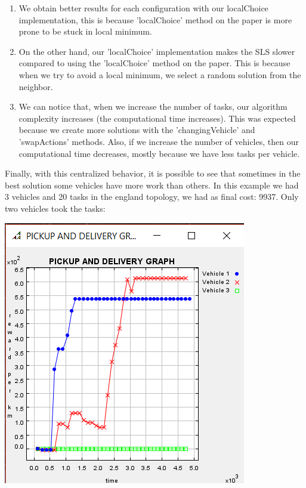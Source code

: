 \documentclass[11pt]{article}
\begin{document}
\begin{enumerate}
\item We obtain better results for each configuration with our localChoice implementation, this is because 'localChoice' method on the paper is more prone to be stuck in local minimum.
\item On the other hand, our 'localChoice' implementation makes the SLS slower compared to using the 'localChoice' method on the paper. This is because when we try to avoid a local minimum, we select a random solution from the neighbor.
\item We can notice that, when we increase the number of tasks, our algorithm complexity increases (the computational time increases). This was expected because we create more solutions with the 'changingVehicle' and 'swapActions' methods. Also, if we increase the number of vehicles, then our computational time decreases, mostly because we have less tasks per vehicle.
\end{enumerate}
\normalsize
Finally, with this centralized behavior, it is possible to see that sometimes in the best solution some vehicles have more work than others. In this example we had 3 vehicles and 20 tasks in the england topology, we had as final cost: 9937. Only two vehicles took the tasks:
\begin{center}
\includegraphics[scale=0.5]{2_vehicl.png}
\end{center}
\end{document}
